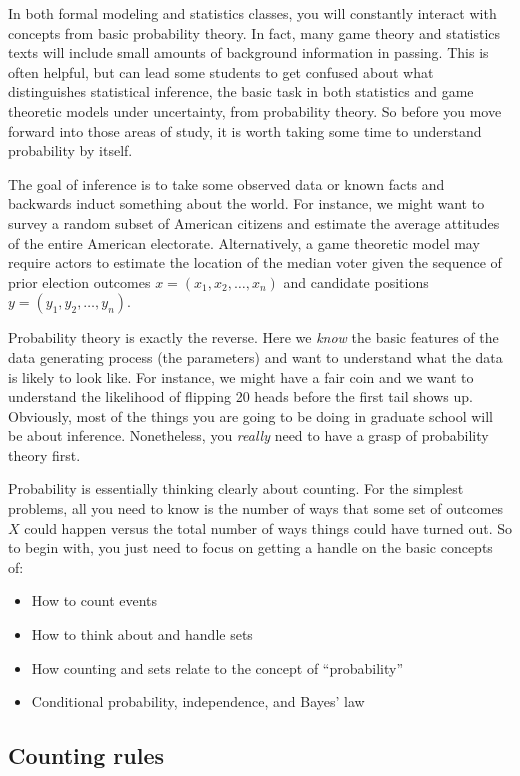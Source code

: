 \documentclass[20pt]{extarticle}
\newcommand{\bi}{\begin{itemize}}
\newcommand{\ei}{\end{itemize}}
\begin{document}
In both formal modeling and statistics classes, you will constantly
interact with concepts from basic probability theory.  In fact, many
game theory and statistics texts will include small amounts of
background information in passing.  This is often helpful, but can
lead some students to get confused about what distinguishes
statistical inference, the basic task in both statistics and game
theoretic models under uncertainty, from probability theory.  So
before you move forward into those areas of study, it is worth taking
some time to understand probability by itself.

The goal of inference is to take some observed data or known facts and
backwards induct something about the world.  For instance, we might want
to survey a random subset of American citizens and estimate the
average attitudes of the entire American electorate.  Alternatively, a
game theoretic model may require actors to estimate the location of
the median voter given the sequence of prior election outcomes
$x=(x_1, x_2, \ldots, x_n)$ and candidate positions $y=(y_1, y_2,
\ldots, y_n)$.

Probability theory is exactly the reverse.  Here we \textit{know} the
basic features of the data generating process (the parameters) and
want to understand what the data is likely to look like.  For
instance, we might have a fair coin and we want to understand the
likelihood of flipping 20 heads before the first tail shows up.
Obviously, most of the things you are going to be doing in graduate
school will be about inference.  Nonetheless, you \textit{really}
need to have a grasp of probability theory first.  

Probability is essentially thinking clearly about counting.  For the
simplest problems, all you need to know is the number of ways that some
set of outcomes $X$ could happen versus the total number of ways
things could have turned out.  So to begin with, you just need to
focus on getting a handle on the basic concepts of:
\bi
\item How to count events
\item How to think about and handle sets
\item How counting and sets relate to the concept of ``probability''
\item Conditional probability, independence, and Bayes' law
\ei

\newpage

\subsection{Counting rules}
\end{document}
